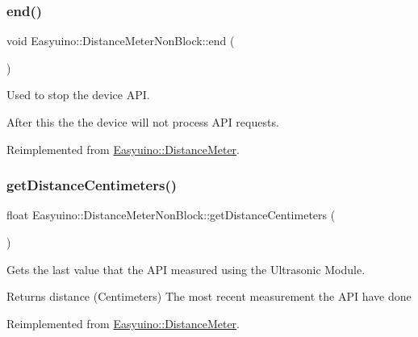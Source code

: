 \subsubsection{\texorpdfstring{end()}{end()}}
{\footnotesize\ttfamily void Easyuino\+::\+Distance\+Meter\+Non\+Block\+::end (\begin{DoxyParamCaption}{ }\end{DoxyParamCaption})\hspace{0.3cm}{\ttfamily [virtual]}}



Used to stop the device A\+PI. 

After this the the device will not process A\+PI requests. 

Reimplemented from \hyperlink{class_easyuino_1_1_distance_meter_a8a818cc922418ae5a078193dbfab1e6b}{Easyuino\+::\+Distance\+Meter}.

\mbox{\label{class_easyuino_1_1_distance_meter_non_block_a00419fc2c2ff7c587735063971aa7464}} 
\subsubsection{\texorpdfstring{get\+Distance\+Centimeters()}{getDistanceCentimeters()}}
{\footnotesize\ttfamily float Easyuino\+::\+Distance\+Meter\+Non\+Block\+::get\+Distance\+Centimeters (\begin{DoxyParamCaption}{ }\end{DoxyParamCaption})\hspace{0.3cm}{\ttfamily [virtual]}}



Gets the last value that the A\+PI measured using the Ultrasonic Module. 

\begin{DoxyReturn}{Returns}
distance (Centimeters) The most recent measurement the A\+PI have done 
\end{DoxyReturn}


Reimplemented from \hyperlink{class_easyuino_1_1_distance_meter_a637cdd0d3e4f3bcf094704ae91e0c7c3}{Easyuino\+::\+Distance\+Meter}.

\mbox{\label{class_easyuino_1_1_distance_meter_non_block_a4ea37c6c0562a76cd03636db329743f9}} 
